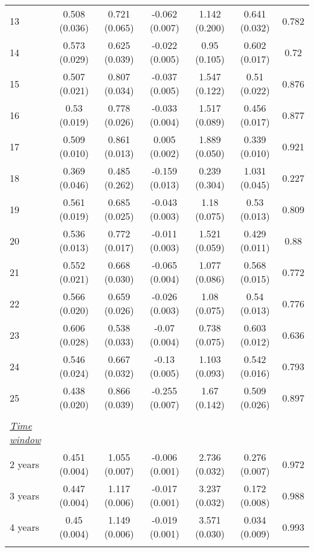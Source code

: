 \begin{tabular}{@{\extracolsep{5pt}} l cccccc}
13 & 0.508 (0.036) & 0.721 (0.065) & -0.062 (0.007) & 1.142 (0.200) & 0.641 (0.032) & 0.782 \\ 
14 & 0.573 (0.029) & 0.625 (0.039) & -0.022 (0.005) & 0.95 (0.105) & 0.602 (0.017) & 0.72 \\ 
15 & 0.507 (0.021) & 0.807 (0.034) & -0.037 (0.005) & 1.547 (0.122) & 0.51 (0.022) & 0.876 \\ 
16 & 0.53 (0.019) & 0.778 (0.026) & -0.033 (0.004) & 1.517 (0.089) & 0.456 (0.017) & 0.877 \\ 
17 & 0.509 (0.010) & 0.861 (0.013) & 0.005 (0.002) & 1.889 (0.050) & 0.339 (0.010) & 0.921 \\ 
18 & 0.369 (0.046) & 0.485 (0.262) & -0.159 (0.013) & 0.239 (0.304) & 1.031 (0.045) & 0.227 \\ 
19 & 0.561 (0.019) & 0.685 (0.025) & -0.043 (0.003) & 1.18 (0.075) & 0.53 (0.013) & 0.809 \\ 
20 & 0.536 (0.013) & 0.772 (0.017) & -0.011 (0.003) & 1.521 (0.059) & 0.429 (0.011) & 0.88 \\ 
21 & 0.552 (0.021) & 0.668 (0.030) & -0.065 (0.004) & 1.077 (0.086) & 0.568 (0.015) & 0.772 \\ 
22 & 0.566 (0.020) & 0.659 (0.026) & -0.026 (0.003) & 1.08 (0.075) & 0.54 (0.013) & 0.776 \\ 
23 & 0.606 (0.028) & 0.538 (0.033) & -0.07 (0.004) & 0.738 (0.075) & 0.603 (0.012) & 0.636 \\ 
24 & 0.546 (0.024) & 0.667 (0.032) & -0.13 (0.005) & 1.103 (0.093) & 0.542 (0.016) & 0.793 \\ 
25 & 0.438 (0.020) & 0.866 (0.039) & -0.255 (0.007) & 1.67 (0.142) & 0.509 (0.026) & 0.897 \\ 
 &   &   &   &   &   &  \\ 
\underline{{\it Time window}} &   &   &   &   &   &  \\ 
2 years & 0.451 (0.004) & 1.055 (0.007) & -0.006 (0.001) & 2.736 (0.032) & 0.276 (0.007) & 0.972 \\ 
3 years & 0.447 (0.004) & 1.117 (0.006) & -0.017 (0.001) & 3.237 (0.032) & 0.172 (0.008) & 0.988 \\ 
4 years & 0.45 (0.004) & 1.149 (0.006) & -0.019 (0.001) & 3.571 (0.030) & 0.034 (0.009) & 0.993 \\ 
\hline \\[-1.8ex] 
\end{tabular} 
